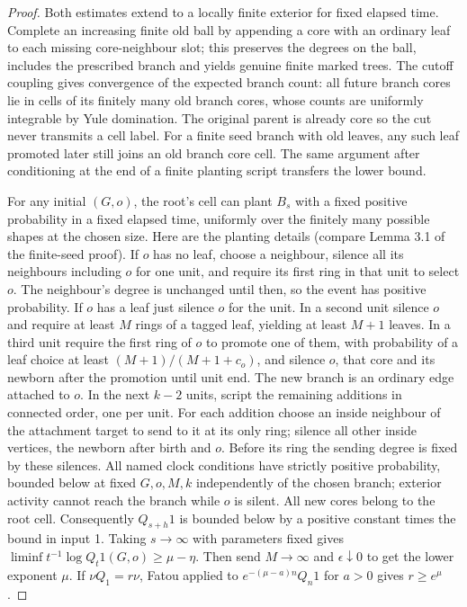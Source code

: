 \documentclass[11pt]{article}
\theoremstyle{remark}
\numberwithin{equation}{section}
\begin{document}
\begin{proof}
Both estimates extend to a locally finite exterior for fixed elapsed time. Complete an increasing finite old ball by appending a core with an ordinary leaf to each missing core-neighbour slot; this preserves the degrees on the ball, includes the prescribed branch and yields genuine finite marked trees. The cutoff coupling gives convergence of the expected branch count: all future branch cores lie in cells of its finitely many old branch cores, whose counts are uniformly integrable by Yule domination. The original parent is already core so the cut never transmits a cell label. For a finite seed branch with old leaves, any such leaf promoted later still joins an old branch core cell. The same argument after conditioning at the end of a finite planting script transfers the lower bound.

For any initial $(G,o)$, the root's cell can plant $B_s$ with a fixed positive probability in a fixed elapsed time, uniformly over the finitely many possible shapes at the chosen size. Here are the planting details (compare Lemma 3.1 of the finite-seed proof). If $o$ has no leaf, choose a neighbour, silence all its neighbours including $o$ for one unit, and require its first ring in that unit to select $o$. The neighbour's degree is unchanged until then, so the event has positive probability. If $o$ has a leaf just silence $o$ for the unit. In a second unit silence $o$ and require at least $M$ rings of a tagged leaf, yielding at least $M+1$ leaves. In a third unit require the first ring of $o$ to promote one of them, with probability of a leaf choice at least $(M+1)/(M+1+c_o)$, and silence $o$, that core and its newborn after the promotion until unit end. The new branch is an ordinary edge attached to $o$. In the next $k-2$ units, script the remaining additions in connected order, one per unit. For each addition choose an inside neighbour of the attachment target to send to it at its only ring; silence all other inside vertices, the newborn after birth and $o$. Before its ring the sending degree is fixed by these silences. All named clock conditions have strictly positive probability, bounded below at fixed $G,o,M,k$ independently of the chosen branch; exterior activity cannot reach the branch while $o$ is silent. All new cores belong to the root cell. Consequently $Q_{s+h}1$ is bounded below by a positive constant times the bound in input 1. Taking $s\to\infty$ with parameters fixed gives $\liminf t^{-1}\log Q_t1(G,o)\ge\mu-\eta$. Then send $M\to\infty$ and $\epsilon\downarrow0$ to get the lower exponent $\mu$. If $\nu Q_1=r\nu$, Fatou applied to $e^{-(\mu-a)n}Q_n1$ for $a>0$ gives $r\ge e^\mu$.


\end{proof}
\end{document}
